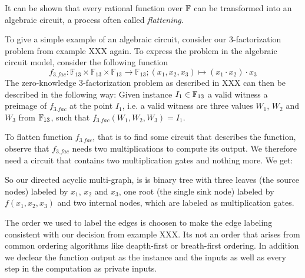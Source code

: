 It can be shown that every rational function over $\mathbb{F}$ can be transformed into an algebraic circuit, a process often called \textit{flattening}.
\begin{example} To give a simple example of an algebraic circuit, consider our $3$-factorization problem from example XXX again.  To express the problem in the algebraic circuit model, consider the following function 
\[
f_{3.fac}:\mathbb{F}_{13}\times\mathbb{F}_{13}\times\mathbb{F}_{13}\to\mathbb{F}_{13};(x_{1},x_{2},x_{3})\mapsto(x_{1}\cdot x_{2})\cdot x_{3}
\]
The zero-knowledge $3$-factorization problem as described in XXX can then be described in the following way: Given instance $I_1\in \mathbb{F}_{13}$ a valid witness a preimage of $f_{3.fac}$ at the point $I_1$, i.e. a valid witness are three values $W_1$, $W_2$ and $W_3$ from $\mathbb{F}_{13}$, such that $f_{3.fac}(W_1,W_2,W_3)=I_1$. 

To flatten function $f_{3.fac}$, that is to find some circuit that describes the function, observe that $f_{3.fac}$ needs two multiplications to compute its output. We therefore need a circuit that contains two multiplication gates and nothing more. We get:

\begin{center}
\end{center}
So our directed acyclic multi-graph, is is binary tree with three leaves (the source nodes) labeled by $x_1$, $x_2$ and $x_3$, one root (the single sink node) labeled by $f(x_1,x_2,x_3)$ and two internal nodes, which are labeled as multiplication gates. 

The order we used to label the edges is choosen to make the edge labeling consistent with our decision from example XXX. Its not an order that arises from common ordering algorithms like deapth-first or breath-first ordering. In addition we declear the function output as the instance and the inputs as well as every step in the computation as private inputs.
\end{example}

